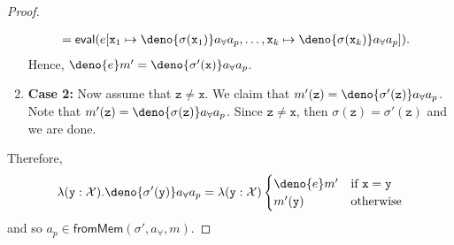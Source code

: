 \documentclass[acmsmall,review,anonymous]{acmart}\settopmatter{printfolios=true,printccs=false,printacmref=false}
\begin{document}
\begin{proof}
\begin{enumerate}
\begin{align*}
                             &= \mathsf{eval}(e[\mathtt{x}_1 \mapsto \deno{\sigma(\mathtt{x}_1)}a_{\forall}a_p, \ldots, \mathtt{x}_k \mapsto \deno{\sigma(\mathtt{x}_k)}a_{\forall}a_p]).
    \end{align*}
    Hence, $\deno{e}m' = \deno{\sigma'(\mathtt{x})}a_{\forall}a_p$.
  \item \textbf{Case 2:} Now assume that $\mathtt{z} \neq \mathtt{x}$. We claim that $m'(\mathtt{z}) = \deno{\sigma'(\mathtt{z})}a_{\forall}a_p$. Note that $m'(\mathtt{z}) = \deno{\sigma(\mathtt{z})}a_{\forall}a_p$. Since $\mathtt{z}\neq\mathtt{x}$, then $\sigma(\mathtt{z}) = \sigma'(\mathtt{z})$ and we are done.
  \end{enumerate}
  Therefore,
  \[
    \lambda (\mathtt{y} : \mathcal{X}) . \deno{\sigma'(\mathtt{y})}a_{\forall}a_p = \lambda (\mathtt{y} : \mathcal{X})
    \begin{cases}
      \deno{e}m' & \text{if $\mathtt{x}=\mathtt{y}$}\\
      m'(\mathtt{y}) & \text{otherwise}
    \end{cases}
  \] and so $a_p \in \mathsf{fromMem}(\sigma',a_{\forall},m)$.
  

\end{proof}
\end{document}

